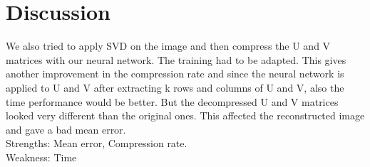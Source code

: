 \section{Discussion} \label{sec:discussion}

We also tried to apply SVD on the image and then compress the U and V matrices with our neural network. The training had to be adapted. This gives another improvement in the compression rate and since the neural network is applied to U and V after extracting k rows and columns of U and V, also the time performance would be better. But the decompressed U and V matrices looked very different than the original ones. This affected the reconstructed image and gave a bad mean error.\\

Strengths: Mean error, Compression rate.\\ 
Weakness: Time
